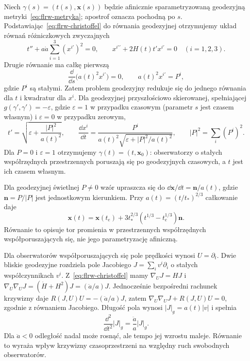 
\begin{przyklad}
\label{prz:flrw-geodezyjne}
Niech $\gamma(s)=(t(s),\mathbf x(s))$ będzie afinicznie
sparametryzowaną geodezyjną metryki~\eqref{eq:flrw-metryka};
apostrof oznacza pochodną po $s$.
Podstawiając~\eqref{eq:flrw-christoffel} do równania geodezyjnej
otrzymujemy układ równań różniczkowych zwyczajnych
\begin{equation}\label{eq:flrw-ode-geodezyjnych}
 t''+a\dot a\sum_{i=1}^3(x^{i\prime})^2=0,\qquad
 x^{i\prime\prime}+2H(t)t'x^{i\prime}=0
 \quad(i=1,2,3).
\end{equation}
Drugie równanie ma całkę pierwszą
\begin{equation}\label{eq:flrw-momenty}
 \frac{\dd}{\dd s}\bigl(a(t)^2x^{i\prime}\bigr)=0,
 \qquad a(t)^2x^{i\prime}=P^i,
\end{equation}
gdzie $P^i$ są stałymi. Zatem problem geodezyjny
redukuje się do jednego równania dla $t$ i kwadratur dla $x^i$.
Dla geodezyjnej przyszłościowo skierowanej, spełniającej
$g(\gamma',\gamma')=-\varepsilon$,
gdzie $\varepsilon=1$ w przypadku czasowym (parametr $s$ jest
czasem własnym) i $\varepsilon=0$ w przypadku zerowym,
\begin{equation}\label{eq:flrw-pierwsza-calka}
 t'=\sqrt{\varepsilon+\frac{|P|^2}{a(t)^2}},\qquad
 \frac{\dd x^i}{\dd t}
 =\frac{P^i}{a(t)^2\sqrt{\varepsilon+|P|^2/a(t)^2}},
 \qquad |P|^2=\sum_i(P^i)^2.
\end{equation}
Dla $P=0$ i $\varepsilon=1$ otrzymujemy
$\gamma(t)=(t,\mathbf x_0)$: obserwatorzy o stałych
współrzędnych przestrzennych poruszają się po geodezyjnych
czasowych, a $t$ jest ich czasem własnym.

Dla geodezyjnej świetlnej $P\ne0$ wzór upraszcza się do
$\dd\mathbf x/\dd t=\mathbf n/a(t)$,
gdzie $\mathbf n=P/|P|$ jest jednostkowym kierunkiem.
Przy $a(t)=(t/t_*)^{2/3}$ całkowanie daje
\begin{equation}\label{eq:flrw-swiatlo}
 \mathbf x(t)=\mathbf x(t_e)+
 3t_*^{2/3}(t^{1/3}-t_e^{1/3})\mathbf n.
\end{equation}
Równanie to opisuje tor promienia w przestrzennych
współrzędnych współporuszających się, nie jego parametryzację afiniczną.
\end{przyklad}

\begin{przyklad}
\label{prz:flrw-jacobi}
Dla obserwatorów współporuszających się pole prędkości wynosi
$U=\partial_t$. Dwie bliskie geodezyjne rozdziela pole Jacobiego
$J=\sum_i v^i\partial_i$ o stałych współczynnikach $v^i$.
Z~\eqref{eq:flrw-christoffel} mamy
$\nabla_UJ=HJ$ i
$\nabla_U\nabla_UJ=(\dot H+H^2)J=(\ddot a/a)J$.
Jednocześnie bezpośredni rachunek krzywizny daje
$R(J,U)U=-(\ddot a/a)J$, zatem
$\nabla_U\nabla_UJ+R(J,U)U=0$, zgodnie z równaniem Jacobiego.
Długość pola wynosi $|J|_g=a(t)|v|$ i spełnia
\[
 \frac{\dd^2}{\dd t^2}|J|_g
 =\frac{\ddot a}{a}|J|_g.
\]
Dla $\ddot a<0$ odległość nadal może rosnąć, ale tempo jej
wzrostu maleje. Równanie to wyraża wpływ krzywizny
czasoprzestrzeni na względny ruch swobodnych obserwatorów.
\end{przyklad}

